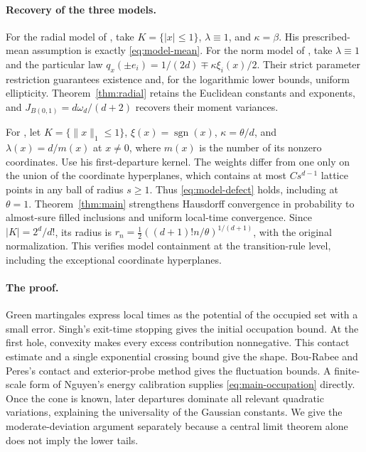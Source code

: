 \documentclass[11pt]{amsart}
\theoremstyle{plain}
\theoremstyle{definition}
\numberwithin{equation}{section}
\begin{document}
\paragraph{Recovery of the three models.}
For the radial model of \citet{Singh2026}, take $K=\{|x|\le1\}$,
$\lambda\equiv1$, and $\kappa=\beta$. His prescribed-mean assumption
is exactly \eqref{eq:model-mean}. For the norm model of
\citet{BouRabeePeres2026CERW}, take $\lambda\equiv1$ and the particular
law $q_x(\pm e_i)=1/(2d)\mp\kappa\xi_i(x)/2$. Their strict parameter
restriction guarantees existence and, for the logarithmic lower
bounds, uniform ellipticity. Theorem~\ref{thm:radial} retains the
Euclidean constants and exponents, and
$J_{B(0,1)}=d\omega_d/(d+2)$ recovers their moment variances.

For \citet{Nguyen2026}, let $K=\{\|x\|_1\le1\}$,
$\xi(x)=\operatorname{sgn}(x)$, $\kappa=\theta/d$, and
$\lambda(x)=d/m(x)$ at $x\ne0$, where $m(x)$ is the number of its
nonzero coordinates. Use his first-departure kernel. The weights
differ from one only on the union of the coordinate hyperplanes,
which contains at most $Cs^{d-1}$ lattice points in any ball of radius
$s\ge1$. Thus \eqref{eq:model-defect} holds, including at $\theta=1$.
Theorem~\ref{thm:main} strengthens Hausdorff convergence in probability
to almost-sure filled inclusions and uniform local-time convergence.
Since $|K|=2^d/d!$, its radius is
$r_n=\tfrac12((d+1)!n/\theta)^{1/(d+1)}$, with the original
normalization. This verifies model containment at the transition-rule
level, including the exceptional coordinate hyperplanes.

\paragraph{The proof.}
Green martingales express local times as the potential of the occupied
set with a small error. Singh's exit-time stopping gives the initial occupation bound. At the first hole, convexity makes every excess contribution
nonnegative. This contact estimate and a single exponential crossing
bound give the shape. Bou-Rabee and Peres's contact and exterior-probe method gives the
fluctuation bounds. A finite-scale form of Nguyen's energy calibration supplies
\eqref{eq:main-occupation} directly. Once the cone is known, later departures dominate
all relevant quadratic variations, explaining the universality of the
Gaussian constants. We give the moderate-deviation argument separately
because a central limit theorem alone does not imply the lower tails.
\end{document}
